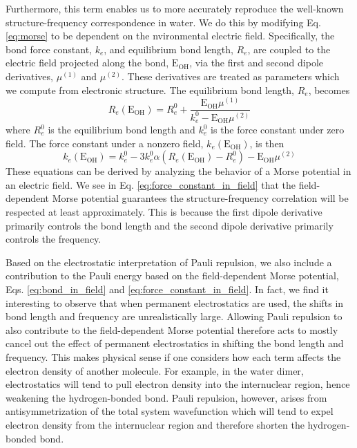 \documentclass[journal=jctcce,manuscript=article]{achemso}
\begin{document}
Furthermore, this term enables us to more accurately reproduce the well-known structure-frequency correspondence in water.\cite{boyer2019beyond} We do this
by modifying Eq. \ref{eq:morse} to be dependent on the nvironmental electric field. Specifically, the bond force constant, $k_e$,
and equilibrium bond length, $R_e$, are coupled to the electric field projected along the bond, $\mathrm{E_{OH}}$,
via the first and second dipole derivatives, $\mu^{(1)}$ and $\mu^{(2)}$. These derivatives
are treated as parameters which we compute from electronic structure. The equilibrium bond
length, $R_e$, becomes
\begin{equation}
  R_e(\mathrm{E_{OH}})=R_e^0+ \frac{\mathrm{E_{OH}}\mu^{(1)}}{k_e^0-\mathrm{E_{OH}}\mu^{(2)}}
  \label{eq:bond_in_field}
\end{equation}
where $R_e^0$ is the equilibrium bond length and $k_e^0$ is the force constant under zero field. The force constant under a nonzero field, $k_e(\mathrm{E_{OH}})$, is then
\begin{equation}
  k_e(\mathrm{E_{OH}})=k_e^0-3k_e^0\alpha\left(R_e(\mathrm{E_{OH}})-R_e^0\right)-\mathrm{E_{OH}}\mu^{(2)}
  \label{eq:force_constant_in_field}
\end{equation}
These equations can be derived by analyzing the behavior of a Morse potential in an electric field.\cite{boyer2019beyond} We see in Eq. \ref{eq:force_constant_in_field} that the field-dependent Morse potential guarantees the structure-frequency correlation will be respected at least approximately. This is because the first dipole derivative
primarily controls the bond length and the second dipole derivative primarily controls the frequency.

Based on the electrostatic interpretation of Pauli repulsion, we also include a contribution
to the Pauli energy based on the field-dependent Morse potential, Eqs. \ref{eq:bond_in_field} and \ref{eq:force_constant_in_field}.
In fact, we find it interesting to observe that when permanent electrostatics are used, the shifts
in bond length and frequency are unrealistically large. Allowing Pauli repulsion to also contribute
to the field-dependent Morse potential therefore acts to mostly cancel out the effect of permanent
electrostatics in shifting the bond length and frequency. This makes physical sense if one considers
how each term affects the electron density of another molecule. For example, in the water dimer, electrostatics will tend to pull electron density into the internuclear region, hence weakening the hydrogen-bonded  bond. Pauli repulsion, however, arises from antisymmetrization of the total system wavefunction which
will tend to expel electron density from the internuclear region and therefore shorten the hydrogen-bonded  bond.
\end{document}
